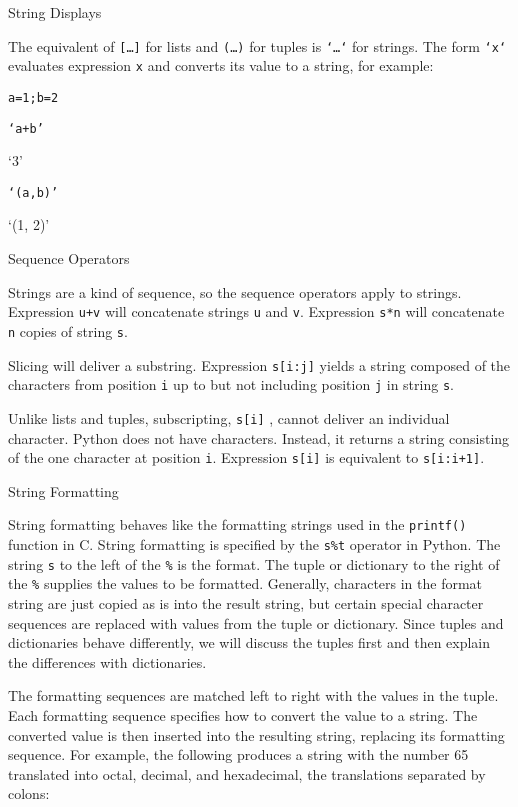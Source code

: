 String Displays

The equivalent of
\texttt{{[}\ldots{}{]}} for lists and \texttt{(\ldots{})} for tuples is
\texttt{`\ldots{}`} for strings. The form \texttt{`x`} evaluates expression
\texttt{x} and converts its value to a string, for example:


\texttt{a=1;b=2}


\texttt{`a+b'}

`3'


\texttt{`(a,b)'}

`(1, 2)'

Sequence Operators

Strings are a kind of sequence, so
the sequence operators apply to strings. Expression \texttt{u+v} will
concatenate strings \texttt{u} and \texttt{v}. Expression \texttt{s*n} will
concatenate \texttt{n} copies of string \texttt{s}.

Slicing will deliver a substring.
Expression \texttt{s{[}i:j{]}} yields a string composed of the characters
from position \texttt{i} up to but not including position \texttt{j} in
string \texttt{s}.

Unlike lists and tuples,
subscripting, \texttt{s{[}i{]}} , cannot deliver an individual character.
Python does not have characters. Instead, it returns a string consisting
of the one character at position \texttt{i}. Expression \texttt{s{[}i{]}}
is equivalent to \texttt{s{[}i:i+1{]}}.

String Formatting

String formatting behaves like the
formatting strings used in the \texttt{printf()} function in C. String
formatting is specified by the \texttt{s\%t} operator in Python. The
string \texttt{s} to the left of the \texttt{\%} is the format. The tuple or
dictionary to the right of the \texttt{\%} supplies the values to be
formatted. Generally, characters in the format string are just copied as
is into the result string, but certain special character sequences are
replaced with values from the tuple or dictionary. Since tuples and
dictionaries behave differently, we will discuss the tuples first and
then explain the differences with dictionaries.

 The formatting
sequences are matched left to right with the values in the tuple. Each
formatting sequence specifies how to convert the value to a string. The
converted value is then inserted into the resulting string, replacing
its formatting sequence. For example, the following produces a string
with the number 65 translated into octal, decimal, and hexadecimal, the
translations separated by colons:


